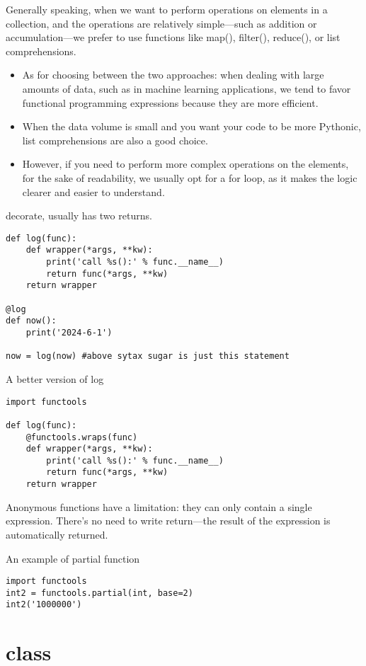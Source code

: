 \documentclass[a4paper,12pt,twoside]{book}
\begin{document}
Generally speaking, when we want to perform operations on elements in a collection, and the operations are relatively simple—such as addition or accumulation—we prefer to use functions like map(), filter(), reduce(), or list comprehensions.

\begin{itemize}
	\item As for choosing between the two approaches: when dealing with large amounts of data, such as in machine learning applications, we tend to favor functional programming expressions because they are more efficient. 
	
	\item When the data volume is small and you want your code to be more Pythonic, list comprehensions are also a good choice.
	
	\item However, if you need to perform more complex operations on the elements, for the sake of readability, we usually opt for a for loop, as it makes the logic clearer and easier to understand.
	
\end{itemize}


decorate, usually has two returns. 
\begin{lstlisting}
def log(func):
	def wrapper(*args, **kw):
		print('call %s():' % func.__name__)
		return func(*args, **kw)
	return wrapper
	
@log
def now():
	print('2024-6-1')
	
now = log(now) #above sytax sugar is just this statement
\end{lstlisting}

	A better version of log
\begin{lstlisting}
import functools

def log(func):
	@functools.wraps(func)
	def wrapper(*args, **kw):
		print('call %s():' % func.__name__)
		return func(*args, **kw)
	return wrapper
\end{lstlisting}

	Anonymous functions have a limitation: they can only contain a single expression. There's no need to write return—the result of the expression is automatically returned.
	
	An example of partial function
\begin{lstlisting}
import functools
int2 = functools.partial(int, base=2)
int2('1000000')	
\end{lstlisting}

\chapter{class}
\end{document}

